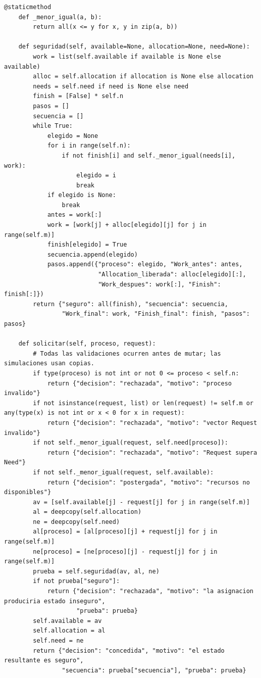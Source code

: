 \documentclass[12pt,a4paper]{article}
\begin{document}
\begin{lstlisting}[style=pycode]
    @staticmethod
    def _menor_igual(a, b):
        return all(x <= y for x, y in zip(a, b))

    def seguridad(self, available=None, allocation=None, need=None):
        work = list(self.available if available is None else available)
        alloc = self.allocation if allocation is None else allocation
        needs = self.need if need is None else need
        finish = [False] * self.n
        pasos = []
        secuencia = []
        while True:
            elegido = None
            for i in range(self.n):
                if not finish[i] and self._menor_igual(needs[i], work):
                    elegido = i
                    break
            if elegido is None:
                break
            antes = work[:]
            work = [work[j] + alloc[elegido][j] for j in range(self.m)]
            finish[elegido] = True
            secuencia.append(elegido)
            pasos.append({"proceso": elegido, "Work_antes": antes,
                          "Allocation_liberada": alloc[elegido][:],
                          "Work_despues": work[:], "Finish": finish[:]})
        return {"seguro": all(finish), "secuencia": secuencia,
                "Work_final": work, "Finish_final": finish, "pasos": pasos}

    def solicitar(self, proceso, request):
        # Todas las validaciones ocurren antes de mutar; las simulaciones usan copias.
        if type(proceso) is not int or not 0 <= proceso < self.n:
            return {"decision": "rechazada", "motivo": "proceso invalido"}
        if not isinstance(request, list) or len(request) != self.m or any(type(x) is not int or x < 0 for x in request):
            return {"decision": "rechazada", "motivo": "vector Request invalido"}
        if not self._menor_igual(request, self.need[proceso]):
            return {"decision": "rechazada", "motivo": "Request supera Need"}
        if not self._menor_igual(request, self.available):
            return {"decision": "postergada", "motivo": "recursos no disponibles"}
        av = [self.available[j] - request[j] for j in range(self.m)]
        al = deepcopy(self.allocation)
        ne = deepcopy(self.need)
        al[proceso] = [al[proceso][j] + request[j] for j in range(self.m)]
        ne[proceso] = [ne[proceso][j] - request[j] for j in range(self.m)]
        prueba = self.seguridad(av, al, ne)
        if not prueba["seguro"]:
            return {"decision": "rechazada", "motivo": "la asignacion produciria estado inseguro",
                    "prueba": prueba}
        self.available = av
        self.allocation = al
        self.need = ne
        return {"decision": "concedida", "motivo": "el estado resultante es seguro",
                "secuencia": prueba["secuencia"], "prueba": prueba}


\end{lstlisting}
\end{document}
